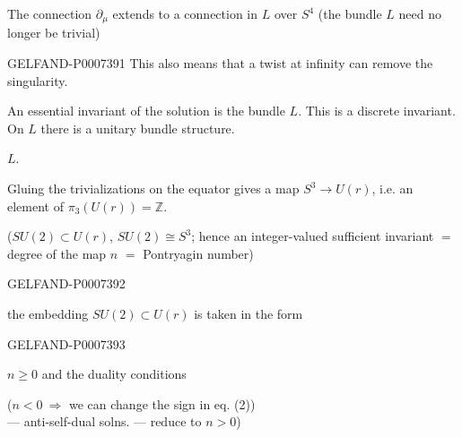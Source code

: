  The connection \(\partial_\mu\) extends to a connection in \(L\) over \(S^4\)
(the bundle \(L\) need no longer be trivial)


\begin{GelfandAdjacentEvidence}{GELFAND-P000739}{1}
This also means that a twist at infinity can remove the singularity.

An essential invariant of the solution is the bundle \(L\). This is a discrete invariant. On \(L\) there is a unitary bundle structure.

 \(L\).

Gluing the trivializations on the equator gives a map \(S^3\to U(r)\), i.e. an element of \(\pi_3(U(r))=\mathbb Z\).

(\(SU(2)\subset U(r)\), \(SU(2)\cong S^3\); hence an integer-valued sufficient invariant
\(=\) degree of the map \(n\) \(=\) Pontryagin number)
\end{GelfandAdjacentEvidence}
\begin{GelfandAdjacentEvidence}{GELFAND-P000739}{2}


the embedding \(SU(2)\subset U(r)\) is taken in the form
\end{GelfandAdjacentEvidence}
\begin{GelfandAdjacentEvidence}{GELFAND-P000739}{3}


 \(n\geq0\) and the duality conditions

(\(n<0\ \Rightarrow\) we can change the sign in eq. (2))\\
\hspace*{2em}--- anti-self-dual solns. --- reduce to \(n>0\))
\end{GelfandAdjacentEvidence}
